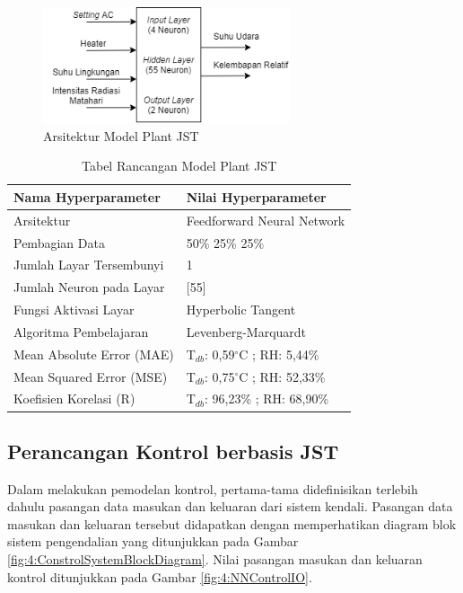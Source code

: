 \begin{figure}[!h]
	\centering
	\includegraphics[width=0.65\textwidth]{figures/NNPlantModelDesign}
	\caption{Arsitektur Model Plant JST}
	\label{fig:4:NNPlantModelDesign}
\end{figure}

\begin{table}[!h]
	\caption{Tabel Rancangan Model Plant JST}
	\label{tbl:5:NNPlantTanto}
	\centering
	\begin{tabular}{|p{5cm}|p{5.2cm}|}
		\hline
		\textbf{Nama Hyperparameter} & \textbf{Nilai Hyperparameter} \\ \hline
		Arsitektur & Feedforward Neural Network \\ \hline
		Pembagian Data & 50\% 25\% 25\% \\ \hline 
		Jumlah Layar Tersembunyi & 1 \\ \hline
		Jumlah Neuron pada Layar & [55] \\ \hline
		Fungsi Aktivasi Layar & Hyperbolic Tangent \\ \hline
		Algoritma Pembelajaran & Levenberg-Marquardt \\ \hline
		Mean Absolute Error (MAE) & T$_{db}$: 0,59$^\circ$C ; RH: 5,44\% \\ \hline
		Mean Squared Error (MSE) & T$_{db}$: 0,75$^\circ$C ; RH: 52,33\% \\ \hline
		Koefisien Korelasi (R) & T$_{db}$: 96,23\% ; RH: 68,90\% \\ \hline
	\end{tabular}
\end{table}


\subsection{Perancangan Kontrol berbasis JST}

Dalam melakukan pemodelan kontrol, pertama-tama didefinisikan terlebih dahulu pasangan data masukan dan keluaran dari sistem kendali. Pasangan data masukan dan keluaran tersebut didapatkan dengan memperhatikan diagram blok sistem pengendalian yang ditunjukkan pada Gambar \ref{fig:4:ConstrolSystemBlockDiagram}. Nilai pasangan masukan dan keluaran kontrol ditunjukkan pada Gambar \ref{fig:4:NNControlIO}.

